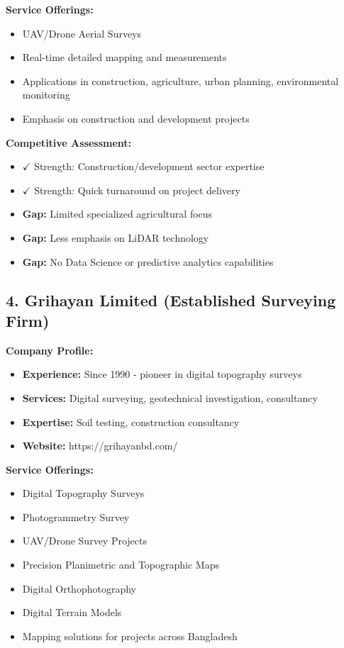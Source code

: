 \textbf{Service Offerings:}
\begin{itemize}
    \item UAV/Drone Aerial Surveys
    \item Real-time detailed mapping and measurements
    \item Applications in construction, agriculture, urban planning, environmental monitoring
    \item Emphasis on construction and development projects
\end{itemize}

\textbf{Competitive Assessment:}
\begin{itemize}
    \item \textcolor{AccentGreen}{$\checkmark$ Strength:} Construction/development sector expertise
    \item \textcolor{AccentGreen}{$\checkmark$ Strength:} Quick turnaround on project delivery
    \item \textbf{Gap:} Limited specialized agricultural focus
    \item \textbf{Gap:} Less emphasis on LiDAR technology
    \item \textbf{Gap:} No Data Science or predictive analytics capabilities
\end{itemize}

\subsection{4. Grihayan Limited (Established Surveying Firm)}

\textbf{Company Profile:}
\begin{itemize}
    \item \textbf{Experience:} Since 1990 - pioneer in digital topography surveys
    \item \textbf{Services:} Digital surveying, geotechnical investigation, consultancy
    \item \textbf{Expertise:} Soil testing, construction consultancy
    \item \textbf{Website:} https://grihayanbd.com/
\end{itemize}

\textbf{Service Offerings:}
\begin{itemize}
    \item Digital Topography Surveys
    \item Photogrammetry Survey
    \item UAV/Drone Survey Projects
    \item Precision Planimetric and Topographic Maps
    \item Digital Orthophotography
    \item Digital Terrain Models
    \item Mapping solutions for projects across Bangladesh
\end{itemize}

